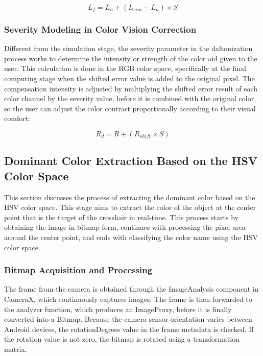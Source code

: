 \begin{equation}
L_{f} = L_{n} + (L_{sim} - L_{n}) \times S
\end{equation}

\subsubsection{Severity Modeling in Color Vision Correction}

Different from the simulation stage, the severity parameter in the daltonization process works to determine the intensity or strength of the color aid given to the user. This calculation is done in the RGB color space, specifically at the final computing stage when the shifted error value is added to the original pixel. The compensation intensity is adjusted by multiplying the shifted error result of each color channel by the severity value, before it is combined with the original color, so the user can adjust the color contrast proportionally according to their visual comfort:

\begin{equation}
R_{d} = R + (R_{shift} \times S)
\end{equation}

\subsection{Dominant Color Extraction Based on the HSV Color Space}

This section discusses the process of extracting the dominant color based on the HSV color space. This stage aims to extract the color of the object at the center point that is the target of the crosshair in real-time. This process starts by obtaining the image in bitmap form, continues with processing the pixel area around the center point, and ends with classifying the color name using the HSV color space.

\subsubsection{Bitmap Acquisition and Processing}

The frame from the camera is obtained through the ImageAnalysis component in CameraX, which continuously captures images. The frame is then forwarded to the analyzer function, which produces an ImageProxy, before it is finally converted into a Bitmap. Because the camera sensor orientation varies between Android devices, the rotationDegrees value in the frame metadata is checked. If the rotation value is not zero, the bitmap is rotated using a transformation matrix.

